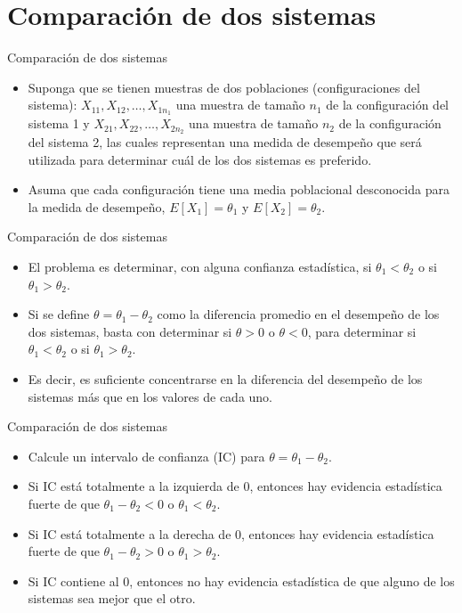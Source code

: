 \section{Comparación de dos sistemas}
\begin{frame}{Comparación de dos sistemas}
    \begin{itemize}
        \item Suponga que se tienen muestras de dos poblaciones (configuraciones del sistema): $X_{11}, X_{12},\dots,X_{1n_1}$ una muestra de tamaño $n_1$ de la configuración del sistema 1 y $X_{21}, X_{22},\dots,X_{2n_2}$ una muestra de tamaño $n_2$ de la configuración del sistema 2, las cuales representan una medida de desempeño que será utilizada para determinar cuál de los dos sistemas es preferido.
        \item Asuma que cada configuración tiene una media poblacional desconocida para la medida de desempeño, $E[X_1]=\theta_1$ y $E[X_2]=\theta_2$.

    \end{itemize}
\end{frame}

\begin{frame}{Comparación de dos sistemas}
    \begin{itemize}
        \item El problema es determinar, con alguna confianza estadística, si $\theta_1<\theta_2$ o si $\theta_1>\theta_2$. 
        \item Si se define $\theta=\theta_1-\theta_2$ como la diferencia promedio en el desempeño de los dos sistemas, basta con determinar si $\theta>0$ o $\theta<0$, para determinar si $\theta_1<\theta_2$ o si $\theta_1>\theta_2$.
        \item Es decir, es suficiente concentrarse en la diferencia del desempeño de los sistemas más que en los valores de cada uno.
    \end{itemize}
\end{frame} 

\begin{frame}{Comparación de dos sistemas}
    \begin{itemize}
        \item Calcule un intervalo de confianza (IC) para $\theta=\theta_1-\theta_2$.
        \item Si IC está totalmente a la izquierda de 0, entonces hay evidencia estadística fuerte de que $\theta_1-\theta_2<0$ o $\theta_1 < \theta_2$.
        \item Si IC está totalmente a la derecha de 0, entonces hay evidencia estadística fuerte de que $\theta_1-\theta_2>0$ o $\theta_1 > \theta_2$.
        \item Si IC contiene al 0, entonces no hay evidencia estadística de que alguno de los sistemas sea mejor que el otro.
    \end{itemize}
\end{frame}

